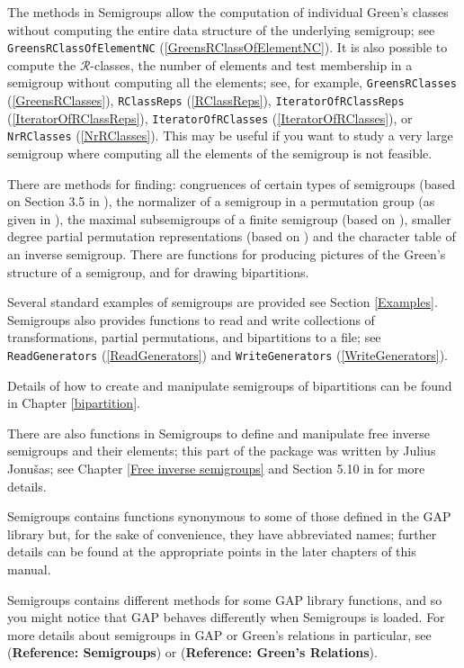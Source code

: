 \documentclass[a4paper,11pt]{report}
\begin{document}
{{ The methods in \textsf{Semigroups} allow the computation of individual Green's classes without computing the
entire data structure of the underlying semigroup; see \texttt{GreensRClassOfElementNC} (\ref{GreensRClassOfElementNC}). It is also possible to compute the $\mathcal{R}$-classes, the number of elements and test membership in a semigroup without
computing all the elements; see, for example, \texttt{GreensRClasses} (\ref{GreensRClasses}), \texttt{RClassReps} (\ref{RClassReps}), \texttt{IteratorOfRClassReps} (\ref{IteratorOfRClassReps}), \texttt{IteratorOfRClasses} (\ref{IteratorOfRClasses}), or \texttt{NrRClasses} (\ref{NrRClasses}). This may be useful if you want to study a very large semigroup where
computing all the elements of the semigroup is not feasible.

 There are methods for finding: congruences of certain types of semigroups
(based on Section 3.5 in \cite{howie}), the normalizer of a semigroup in a permutation group (as given in \cite{Araujo2010aa}), the maximal subsemigroups of a finite semigroup (based on \cite{Graham1968aa}), smaller degree partial permutation representations (based on \cite{Schein1992aa}) and the character table of an inverse semigroup. There are functions for
producing pictures of the Green's structure of a semigroup, and for drawing
bipartitions. 

 Several standard examples of semigroups are provided see Section \ref{Examples}. \textsf{Semigroups} also provides functions to read and write collections of transformations,
partial permutations, and bipartitions to a file; see \texttt{ReadGenerators} (\ref{ReadGenerators}) and \texttt{WriteGenerators} (\ref{WriteGenerators}).

 Details of how to create and manipulate semigroups of bipartitions can be
found in Chapter \ref{bipartition}.

 There are also functions in \textsf{Semigroups} to define and manipulate free inverse semigroups and their elements; this part
of the package was written by Julius Jonu{\v s}as; see Chapter \ref{Free inverse semigroups} and Section 5.10 in \cite{howie} for more details.

 \textsf{Semigroups} contains functions synonymous to some of those defined in the \textsf{GAP} library but, for the sake of convenience, they have abbreviated names; further
details can be found at the appropriate points in the later chapters of this
manual. 

 \textsf{Semigroups} contains different methods for some \textsf{GAP} library functions, and so you might notice that \textsf{GAP} behaves differently when \textsf{Semigroups} is loaded. For more details about semigroups in \textsf{GAP} or Green's relations in particular, see  (\textbf{Reference: Semigroups}) or  (\textbf{Reference: Green's Relations}).

}}
\end{document}
